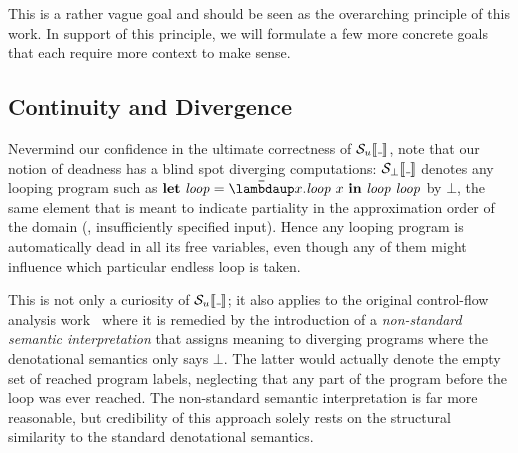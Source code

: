 

This is a rather vague goal and should be seen as the overarching principle of
this work.
In support of this principle, we will formulate a few more concrete goals that
each require more context to make sense.

\subsection{Continuity and Divergence}
\label{sec:continuity}

Nevermind our confidence in the ultimate correctness of $\semusg{\wild}$,
note that our notion of deadness has a blind spot \wrt diverging computations:
$\semscott{\wild}$ denotes any looping program such as
$\Let{\mathit{loop}}{\Lam{x}{\mathit{loop}~x}}{{\mathit{loop}~\mathit{loop}}}$ by $\bot$, the
same element that is meant to indicate partiality in the approximation order
of the domain (\eg, insufficiently specified input).
Hence any looping program is automatically dead in all its free variables, even
though any of them might influence which particular endless loop is taken.

This is not only a curiosity of $\semusg{\wild}$; it also applies to the original
control-flow analysis work~\citep[p. 23]{Shivers:91} where it is remedied
by the introduction of a \emph{non-standard semantic interpretation} that
assigns meaning to diverging programs where the denotational semantics only
says $\bot$.
The latter would actually denote the empty set of reached program labels,
neglecting that any part of the program before the loop was ever reached.
The non-standard semantic interpretation is far more reasonable, but credibility
of this approach solely rests on the structural similarity to the standard
denotational semantics.

